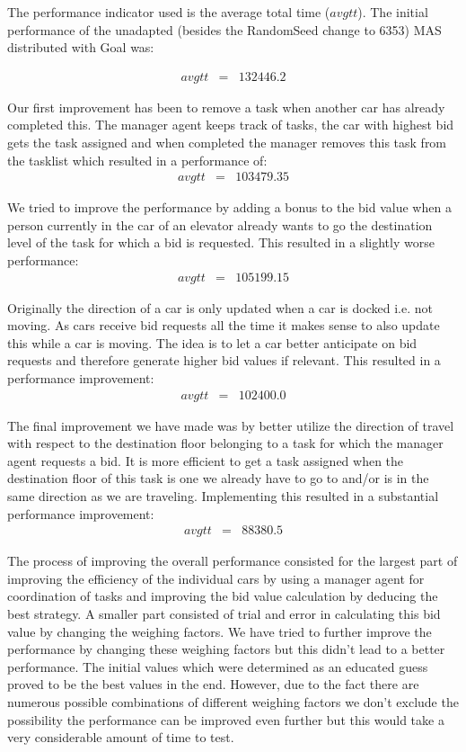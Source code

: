 \documentclass[a4paper,11pt]{article}
\begin{document}
\pagebreak

The performance indicator used is the average total time ($avgtt$). The initial performance of the unadapted (besides the RandomSeed change to 6353) MAS distributed with Goal was:

\[\begin{array}{lcl}
avgtt & = & 132446.2
\end{array}\]

Our first improvement has been to remove a task when another car has already completed this. The manager agent keeps track of tasks, the car with highest bid gets the task assigned and when completed the manager removes this task from the tasklist which resulted in a performance of:
\[\begin{array}{lcl}
avgtt & = & 103479.35
\end{array}\]

We tried to improve the performance by adding a bonus to the bid value when a person currently in the car of an elevator already wants to go the destination level of the task for which a bid is requested. This resulted in a slightly worse performance:
\[\begin{array}{lcl}
avgtt & = & 105199.15
\end{array}\]

Originally the direction of a car is only updated when a car is docked i.e. not moving. As cars receive bid requests all the time it makes sense to also update this while a car is moving. The idea is to let a car better anticipate on bid requests and therefore generate higher bid values if relevant. This resulted in a performance improvement: 
\[\begin{array}{lcl}
avgtt & = & 102400.0
\end{array}\]

The final improvement we have made was by better utilize the direction of travel with respect to the destination floor belonging to a task for which the manager agent requests a bid. It is more efficient to get a task assigned when the destination floor of this task is one we already have to go to and/or is in the same direction as we are traveling. Implementing this resulted in a substantial performance improvement:
\[\begin{array}{lcl}
avgtt & = & 88380.5
\end{array}\]

The process of improving the overall performance consisted for the largest part of improving the efficiency of the individual cars by using a manager agent for coordination of tasks and improving the bid value calculation by deducing the best strategy. A smaller part consisted of trial and error in calculating this bid value by changing the weighing factors. We have tried to further improve the performance by changing these weighing factors but this didn't lead to a better performance. The initial values which were determined as an educated guess proved to be the best values in the end. However, due to the fact there are numerous possible combinations of different weighing factors we don't exclude the possibility the performance can be improved even further but this would take a very considerable amount of time to test. 
\end{document}
